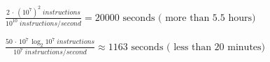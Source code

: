 \documentclass[12pt]{article}
\begin{document}
	$\frac{2\,\cdot\,(10^7)^2 \;instructions}{10^{10} \;instructions/\!second}=20000\mbox{ seconds ( more than 5.5 hours)}$
	
	
	$\frac{50\,\cdot\,10^7\,\log_2{10^7}\;instructions}{10^{7} \;instructions/\!second}\approx1163\mbox{ seconds ( less than 20 minutes)}$
\end{document}
